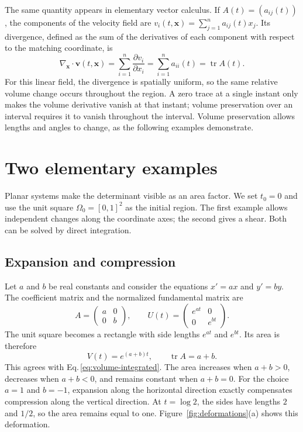 \documentclass[a4paper,11pt]{article}
\newcommand{\vect}[1]{\boldsymbol{#1}}
\DeclareMathOperator{\tr}{tr}
\numberwithin{equation}{section}
\begin{document}
The same quantity appears in elementary vector calculus. If
$A(t)=(a_{ij}(t))$, the components of the velocity field are
$v_i(t,\vect{x})=\sum_{j=1}^{n}a_{ij}(t)x_j$. Its divergence, defined as
the sum of the derivatives of each component with respect to the matching
coordinate, is
\begin{equation}
  \nabla_{\vect{x}}\!\cdot\vect{v}(t,\vect{x})
  =\sum_{i=1}^{n}\frac{\partial v_i}{\partial x_i}
  =\sum_{i=1}^{n}a_{ii}(t)
  =\tr A(t).
  \label{eq:divergence}
\end{equation}
For this linear field, the divergence is spatially uniform, so the same
relative volume change occurs throughout the region. A zero trace at a
single instant only makes the volume derivative vanish at that instant;
volume preservation over an interval requires it to vanish throughout the
interval. Volume preservation allows lengths and angles to change, as the
following examples demonstrate.

\section{Two elementary examples}
\label{sec:examples}

Planar systems make the determinant visible as an area factor. We set
$t_0=0$ and use the unit square $\Omega_0=[0,1]^2$ as the initial region.
The first example allows independent changes along the coordinate axes;
the second gives a shear. Both can be solved by direct integration.

\subsection{Expansion and compression}
\label{sec:diagonal}

Let $a$ and $b$ be real constants and consider the equations $x'=ax$ and
$y'=by$. The coefficient matrix and the normalized fundamental matrix are
\begin{equation}
  A=\begin{pmatrix}a&0\\0&b\end{pmatrix},
  \qquad U(t)=\begin{pmatrix}e^{at}&0\\0&e^{bt}\end{pmatrix}.
  \label{eq:diagonal}
\end{equation}
The unit square becomes a rectangle with side lengths $e^{at}$ and
$e^{bt}$. Its area is therefore
\begin{equation}
  V(t)=e^{(a+b)t},
  \qquad \tr A=a+b.
  \label{eq:diagonal-area}
\end{equation}
This agrees with Eq.\,\eqref{eq:volume-integrated}. The area increases
when $a+b>0$, decreases when $a+b<0$, and remains constant when $a+b=0$.
For the choice $a=1$ and $b=-1$, expansion along the horizontal direction
exactly compensates compression along the vertical direction. At
$t=\log 2$, the sides have lengths $2$ and $1/2$, so the area remains
equal to one. Figure~\ref{fig:deformations}(a) shows this deformation.
\end{document}
